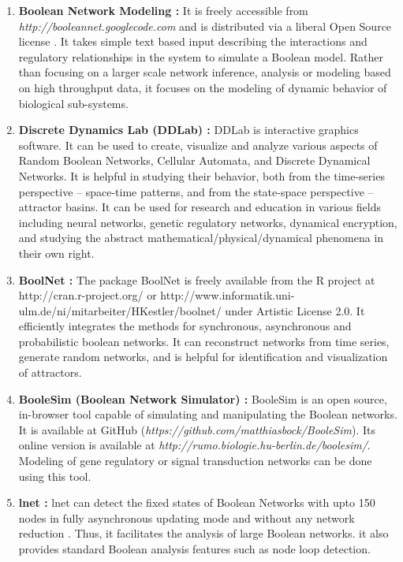 \documentclass[11pt]{report}
\begin{document}
    \begin{enumerate}
     \item \textbf{Boolean Network Modeling : } It is freely accessible from \emph{http://booleannet.googlecode.com} and is distributed via a liberal Open Source license \cite{Albert2008}.
     It takes simple text based input describing the interactions and regulatory relationships in the system to simulate a Boolean model.
     Rather than focusing on a larger scale network inference, analysis or modeling based on high throughput data, it focuses on the modeling of dynamic behavior of biological sub-systems.
    \item \textbf{Discrete Dynamics Lab (DDLab) : } DDLab is interactive graphics software.\cite{Wuensche2008}
    It can be used to create, visualize and analyze various aspects of Random Boolean Networks, Cellular Automata, and Discrete Dynamical Networks.
    It is helpful in studying their behavior, both from the time-series perspective – space-time patterns, and from the state-space perspective – attractor basins.
    It can be used for research and education in various fields including neural networks, genetic regulatory networks, dynamical encryption, and studying the abstract mathematical/physical/dynamical phenomena in their own right.
    \item \textbf{BoolNet : } The package BoolNet is freely available from the R project at http://cran.r-project.org/ or http://www.informatik.uni- ulm.de/ni/mitarbeiter/HKestler/boolnet/ under Artistic License 2.0. \cite{Mussel2010}
    It efficiently integrates the methods for synchronous, asynchronous and probabilistic boolean networks.
    It can reconstruct networks from time series, generate random networks, and is helpful for identification and visualization of attractors.
    \item \textbf{BooleSim (Boolean Network Simulator) : } BooleSim is an open source, in-browser tool capable of simulating and manipulating the Boolean networks\cite{Bock2013}.
    It is available at GitHub (\emph{https://github.com/matthiasbock/BooleSim}).
    Its online version is available at \emph{http://rumo.biologie.hu-berlin.de/boolesim/}.
    Modeling of gene regulatory or signal transduction networks can be done using this tool.
    \item \textbf{lnet : } lnet can detect the fixed states of Boolean Networks with upto 150 nodes in fully asynchronous updating mode and without any network reduction \cite{Berntenis2013}.
    Thus, it facilitates the analysis of large Boolean networks.
    it also provides standard Boolean analysis features such as node loop detection.
    
    \end{enumerate}
    
\end{document}
